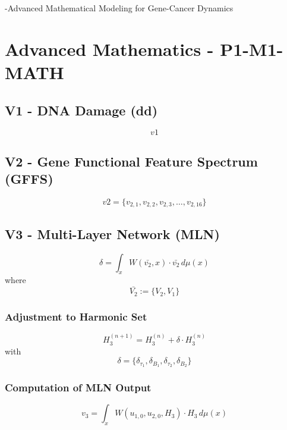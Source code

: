 \documentclass{article}
\begin{document}
-Advanced Mathematical Modeling for Gene-Cancer Dynamics

\section{Advanced Mathematics - P1-M1-MATH}

\subsection{V1 - DNA Damage (dd)}
\begin{equation}
    v1
\end{equation}

\subsection{V2 - Gene Functional Feature Spectrum (GFFS)}
\begin{equation}
    v2 = \{v_{2,1}, v_{2,2}, v_{2,3}, \ldots, v_{2,16}\}
\end{equation}

\subsection{V3 - Multi-Layer Network (MLN)}
\begin{equation}
    \delta = \int_x W(\bar{v_2},x) \cdot \bar{v_2} \, d\mu(x)
\end{equation}
where
\begin{equation}
    \bar{V_2} := \{V_2, V_1\}
\end{equation}

\subsubsection{Adjustment to Harmonic Set}
\begin{equation}
    H_3^{(n+1)} = H_3^{(n)} + \delta \cdot H_3^{(n)}
\end{equation}
with
\begin{equation}
    \delta =\{\delta_{\tau_1}, \delta_{B_1}, \delta_{\tau_2}, \delta_{B_2}\}
\end{equation}

\subsubsection{Computation of MLN Output}
\begin{equation}
    v_3 = \int_x W(u_{1,0}, u_{2,0}, H_3) \cdot H_3 \, d\mu(x)
\end{equation}
\end{document}
